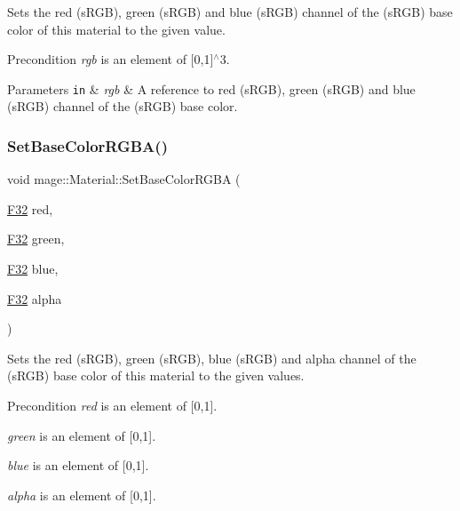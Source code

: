 Sets the red (s\+R\+GB), green (s\+R\+GB) and blue (s\+R\+GB) channel of the (s\+R\+GB) base color of this material to the given value.

\begin{DoxyPrecond}{Precondition}
{\itshape rgb} is an element of \mbox{[}0,1\mbox{]}$^\wedge$3. 
\end{DoxyPrecond}

\begin{DoxyParams}[1]{Parameters}
\mbox{\tt in}  & {\em rgb} & A reference to red (s\+R\+GB), green (s\+R\+GB) and blue (s\+R\+GB) channel of the (s\+R\+GB) base color. \\
\hline
\end{DoxyParams}
\hypertarget{structmage_1_1_material_a7bc1219bcdd57991abe579e06eb60649}{}\label{structmage_1_1_material_a7bc1219bcdd57991abe579e06eb60649} 
\subsubsection{\texorpdfstring{Set\+Base\+Color\+R\+G\+B\+A()}{SetBaseColorRGBA()}\hspace{0.1cm}{\footnotesize\ttfamily [1/3]}}
{\footnotesize\ttfamily void mage\+::\+Material\+::\+Set\+Base\+Color\+R\+G\+BA (\begin{DoxyParamCaption}\item[{\hyperlink{namespacemage_aa97e833b45f06d60a0a9c4fc22ae02c0}{F32}}]{red,  }\item[{\hyperlink{namespacemage_aa97e833b45f06d60a0a9c4fc22ae02c0}{F32}}]{green,  }\item[{\hyperlink{namespacemage_aa97e833b45f06d60a0a9c4fc22ae02c0}{F32}}]{blue,  }\item[{\hyperlink{namespacemage_aa97e833b45f06d60a0a9c4fc22ae02c0}{F32}}]{alpha }\end{DoxyParamCaption})\hspace{0.3cm}{\ttfamily [noexcept]}}

Sets the red (s\+R\+GB), green (s\+R\+GB), blue (s\+R\+GB) and alpha channel of the (s\+R\+GB) base color of this material to the given values.

\begin{DoxyPrecond}{Precondition}
{\itshape red} is an element of \mbox{[}0,1\mbox{]}. 

{\itshape green} is an element of \mbox{[}0,1\mbox{]}. 

{\itshape blue} is an element of \mbox{[}0,1\mbox{]}. 

{\itshape alpha} is an element of \mbox{[}0,1\mbox{]}. 
\end{DoxyPrecond}

